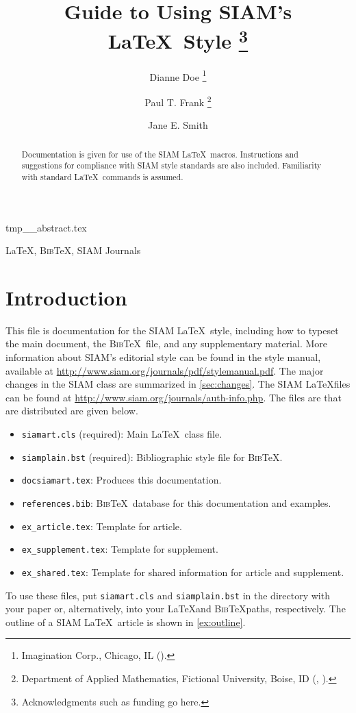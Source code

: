 \documentclass[]{siamart}
\title{Guide to Using SIAM's \LaTeX\ Style%
  \thanks{Acknowledgments such as funding go here.}}
\author{Dianne Doe%
  \thanks{Imagination Corp., Chicago, IL (\email{ddoe@imag.com}).}%
  \and
  Paul T. Frank%
  \thanks{Department of Applied Mathematics, Fictional University, Boise, ID
    (\email{ptfrank@fictional.edu}, \email{jesmith@fictional.edu}).}
  \and
  Jane E. Smith%
  \footnotemark[3]
}
\newcommand{\BibTeX}{{\scshape Bib}\TeX\xspace}
\newcounter{example}
\begin{document}
\maketitle


\begin{tcbverbatimwrite}{tmp_\jobname_abstract.tex}
\begin{abstract}
  Documentation is given for use of the SIAM \LaTeX\ macros.
  Instructions and suggestions for compliance with SIAM style
  standards are also included. Familiarity with standard \LaTeX\
  commands is assumed.
\end{abstract}

\begin{keywords}
  \LaTeX, \BibTeX, SIAM Journals 
\end{keywords}

\begin{AMS}
\end{AMS}
\end{tcbverbatimwrite}


\section{Introduction}
\label{sec:intro}

This file is documentation for the SIAM \LaTeX\ style, including how
to typeset the main document, the \BibTeX\ file, and any supplementary
material. More information
about SIAM's editorial style can be found in the style manual, available
at \url{http://www.siam.org/journals/pdf/stylemanual.pdf}.
%
The major changes in the SIAM class are summarized in \cref{sec:changes}.
%
The SIAM \LaTeX\@ files can be found at
\url{http://www.siam.org/journals/auth-info.php}. The files are that
are distributed are given below. 
\begin{itemize}
\item \texttt{siamart.cls} (required): Main \LaTeX\ class file.
\item \texttt{siamplain.bst} (required): Bibliographic style file for
  \BibTeX.
\item \texttt{docsiamart.tex}: Produces this documentation.
\item \texttt{references.bib}: \BibTeX\ database for this
  documentation and examples.
\item \texttt{ex\_article.tex}: Template for article.
\item \texttt{ex\_supplement.tex}: Template for supplement.
\item \texttt{ex\_shared.tex}: Template for shared information for
  article and supplement.
\end{itemize}
To use these files, put \texttt{siamart.cls} and
\texttt{siamplain.bst} in the directory with your
paper or, alternatively, into your \LaTeX\@ and \BibTeX\@ paths,
respectively. 
%
The outline of a SIAM \LaTeX\ article is shown in \cref{ex:outline}.
\end{document}
